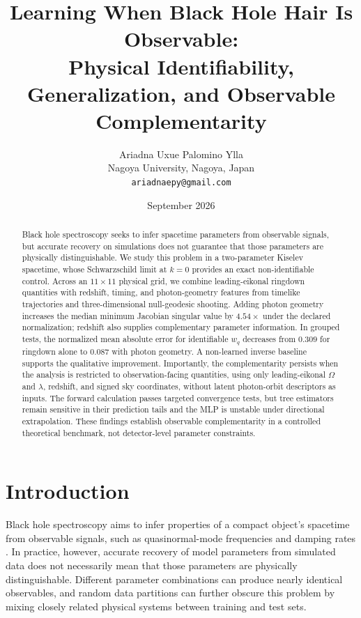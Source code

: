 \documentclass[11pt]{article}
\title{Learning When Black Hole Hair Is Observable:\\Physical Identifiability, Generalization, and Observable Complementarity}
\author{Ariadna Uxue Palomino Ylla\\Nagoya University, Nagoya, Japan\\\texttt{ariadnaepy@gmail.com}}
\date{September 2026}
\begin{document}
\maketitle

\begin{abstract}
Black hole spectroscopy seeks to infer spacetime parameters from observable signals, but accurate recovery on simulations does not guarantee that those parameters are physically distinguishable. We study this problem in a two-parameter Kiselev spacetime, whose Schwarzschild limit at $k=0$ provides an exact non-identifiable control. Across an $11\times11$ physical grid, we combine leading-eikonal ringdown quantities with redshift, timing, and photon-geometry features from timelike trajectories and three-dimensional null-geodesic shooting. Adding photon geometry increases the median minimum Jacobian singular value by $4.54\times$ under the declared normalization; redshift also supplies complementary parameter information. In grouped tests, the normalized mean absolute error for identifiable $w_q$ decreases from $0.309$ for ringdown alone to $0.087$ with photon geometry. A non-learned inverse baseline supports the qualitative improvement. Importantly, the complementarity persists when the analysis is restricted to observation-facing quantities, using only leading-eikonal $\Omega$ and $\lambda$, redshift, and signed sky coordinates, without latent photon-orbit descriptors as inputs. The forward calculation passes targeted convergence tests, but tree estimators remain sensitive in their prediction tails and the MLP is unstable under directional extrapolation. These findings establish observable complementarity in a controlled theoretical benchmark, not detector-level parameter constraints.
\end{abstract}

\section{Introduction}
Black hole spectroscopy aims to infer properties of a compact object's
spacetime from observable signals, such as quasinormal-mode frequencies and
damping rates
\cite{dreyer2004spectroscopy,berti2006spectroscopy,bhagwat2019overtones}.
In practice, however, accurate recovery of model parameters from simulated
data does not necessarily mean that those parameters are physically
distinguishable. Different parameter combinations can produce nearly identical
observables, and random data partitions can further obscure this problem by
mixing closely related physical systems between training and test sets.
\end{document}
